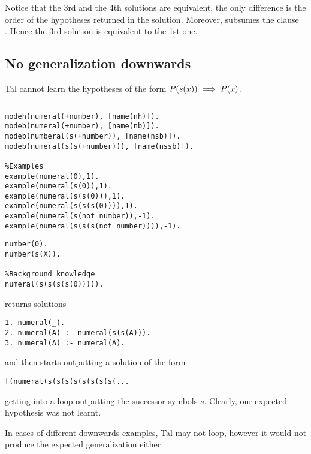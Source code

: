 Notice that the 3rd and the 4th solutions are equivalent, the only difference is the order of the hypotheses returned in the solution. Moreover,  subsumes the clause\\
. Hence the 3rd solution is equivalent to the 1st one.

\subsection{No generalization downwards}\label{tal_no_generalization_downwards}
Tal cannot learn the hypotheses of the form $P(s(x)) \implies P (x)$.
\begin{lstlisting}

\end{lstlisting}

\begin{minipage}[t]{.65\textwidth}
\begin{lstlisting}
modeh(numeral(+number), [name(nh)]).
modeb(numeral(+number), [name(nb)]).
modeb(numberal(s(+number)), [name(nsb)]).
modeb(numeral(s(s(+number))), [name(nssb)]).

%Examples
example(numeral(0),1).
example(numeral(s(0)),1). 
example(numeral(s(s(0))),1).
example(numeral(s(s(s(0)))),1).
example(numeral(s(not_number)),-1).
example(numeral(s(s(s(not_number)))),-1).
\end{lstlisting}
\end{minipage}
\begin{minipage}[t]{.20\textwidth}
\begin{lstlisting}
number(0).
number(s(X)).

%Background knowledge
numeral(s(s(s(s(0))))).
\end{lstlisting}
\end{minipage}

returns solutions
\begin{lstlisting}
1. numeral(_).
2. numeral(A) :- numeral(s(s(A))).
3. numeral(A) :- numeral(A).
\end{lstlisting}
and then starts outputting a solution of the form
\begin{lstlisting}
[(numeral(s(s(s(s(s(s(s(s(...
\end{lstlisting}
getting into a loop outputting the successor symbols $s$. Clearly, our expected hypothesis  was not learnt.

In cases of different downwards examples, Tal may not loop, however it would not produce the expected generalization either.

